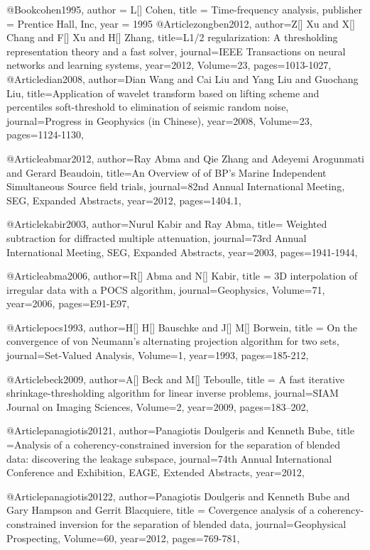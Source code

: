 @Book{cohen1995,
  author = 	 {L[] Cohen},
  title = 	 { Time-frequency analysis},
  publisher = 	 {Prentice Hall, Inc},
  year = 	 1995}
@Article{zongben2012,
  author={Z[] Xu and X[] Chang and F[] Xu and H[] Zhang},
  title={{L}1/2 regularization: A thresholding representation theory and a fast solver},
  journal={IEEE Transactions on neural networks and learning systems},
  year=2012,
  Volume=23,
  pages={1013-1027},
}
@Article{dian2008,
  author={Dian Wang and Cai Liu and Yang Liu and Guochang Liu},
  title={Application of wavelet transform based on lifting scheme and percentiles soft-threshold to elimination of seismic random noise},
  journal={Progress in Geophysics (in Chinese)},
  year=2008,
  Volume=23,
  pages={1124-1130},
}


@Article{abmar2012,
  author={Ray Abma and Qie Zhang and Adeyemi Arogunmati and Gerard Beaudoin},
  title={An Overview of of {BP}'s Marine Independent Simultaneous Source field trials},
  journal={82nd Annual International Meeting, SEG, Expanded Abstracts},
  year=2012,
  pages={1404.1},
}

@Article{kabir2003,
  author={Nurul Kabir and Ray Abma},
  title={	Weighted subtraction for diffracted multiple attenuation},
  journal={73rd Annual International Meeting, SEG, Expanded Abstracts},
  year=2003,
  pages={1941-1944},
}

@Article{abma2006,
  author={R[] Abma and N[] Kabir},
  title = {3{D} interpolation of irregular data with a {POCS} algorithm},
  journal={Geophysics},
  Volume=71,
  year=2006,
  pages={E91-E97},
}

@Article{pocs1993,
  author={H[] H[] Bauschke and J[] M[] Borwein},
  title = {On the convergence of von Neumann's alternating projection algorithm for two sets},
  journal={Set-Valued Analysis},
  Volume=1,
  year=1993,
  pages={185-212},
}


@Article{beck2009,
  author={A[] Beck and M[] Teboulle},
  title = {A fast iterative shrinkage-thresholding algorithm for
linear inverse problems},
  journal={SIAM Journal on Imaging Sciences},
  Volume=2,
  year=2009,
  pages={183–202},
}

@Article{panagiotis20121,
  author={Panagiotis Doulgeris and Kenneth Bube},
  title ={Analysis of a coherency-constrained inversion for the separation of blended data: discovering the leakage subspace},
  journal={74th Annual International Conference and Exhibition, EAGE, Extended Abstracts},
  year=2012,
  }

@Article{panagiotis20122,
  author={Panagiotis Doulgeris and Kenneth Bube and Gary Hampson and Gerrit Blacquiere},
  title = {Covergence analysis of a coherency-constrained inversion for the separation of blended data},
  journal={Geophysical Prospecting},
  Volume=60,
  year=2012,
  pages={769-781},
}

